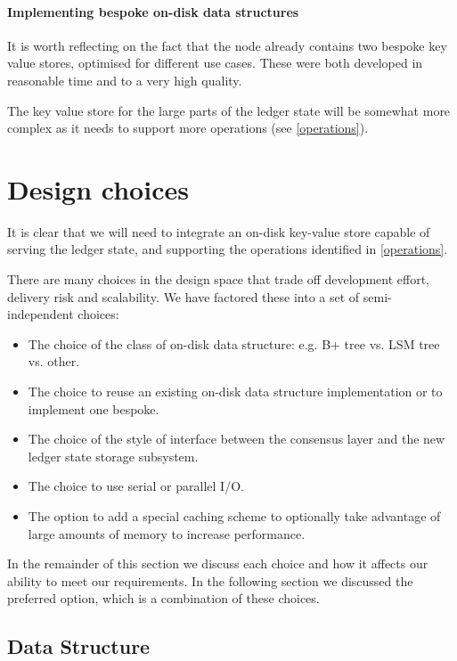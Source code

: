 \documentclass[11pt,a4paper]{article}
\begin{document}
\paragraph{Implementing bespoke on-disk data structures}
It is worth reflecting on the fact that the node already contains two bespoke
key value stores, optimised for different use cases. These were both developed
in reasonable time and to a very high quality.

The key value store for the large parts of the ledger state will be somewhat
more complex as it needs to support more operations (see \cref{operations}).

\section{Design choices}
\label{design-choices}

It is clear that we will need to integrate an on-disk key-value store capable
of serving the ledger state, and supporting the operations identified in
\cref{operations}.

There are many choices in the design space that trade off development effort,
delivery risk and scalability. We have factored these into a set of
semi-independent choices:
\begin{itemize}
\item The choice of the class of on-disk data structure: e.g. B+ tree vs.
      LSM tree vs. other.
\item The choice to reuse an existing on-disk data structure implementation or
      to implement one bespoke.
\item The choice of the style of interface between the consensus layer and
      the new ledger state storage subsystem.
\item The choice to use serial or parallel I/O.
\item The option to add a special caching scheme to optionally take advantage
      of large amounts of memory to increase performance.
\end{itemize}
In the remainder of this section we discuss each choice and how it affects our
ability to meet our requirements. In the following section we discussed the
preferred option, which is a combination of these choices.

\subsection{Data Structure}
\label{data-structure}
\end{document}

